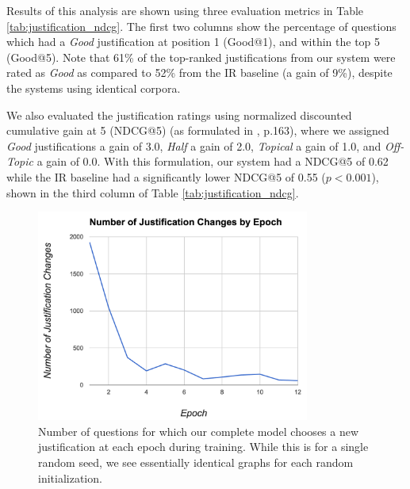Results of this analysis are shown using three evaluation metrics in Table \ref{tab:justification_ndcg}.  The first two columns show the percentage of questions which had a \emph{Good} justification at position 1 (Good@1), and within the top 5 (Good@5).  
Note that 61\% of the top-ranked justifications from our system were rated as \emph{Good} as compared to 52\% from the IR baseline (a gain of 9\%), despite the systems using identical corpora.  

We also evaluated the justification ratings using normalized discounted cumulative gain at 5 (NDCG@5) (as formulated in \citet{manning08}, p.163), where we assigned \emph{Good} justifications a gain of 3.0, \emph{Half} a gain of 2.0, \emph{Topical} a gain of 1.0, and \emph{Off-Topic} a gain of 0.0.  With this formulation, our system had a NDCG@5 of 0.62 while the IR baseline had a significantly lower NDCG@5 of 0.55 ($p < 0.001$), shown in the third column of Table \ref{tab:justification_ndcg}. 

\begin{figure}[t]
\begin{center}
\includegraphics[width=0.8\textwidth]{mainmatter/emnlp2017-qaj/justificationChanges.png}
\caption{Number of questions for which %
our complete model chooses a new justification at each epoch during training.  While this is for a single random seed, we see essentially identical graphs for each random initialization.}
\label{fig:changes}
\end{center}
\end{figure}

